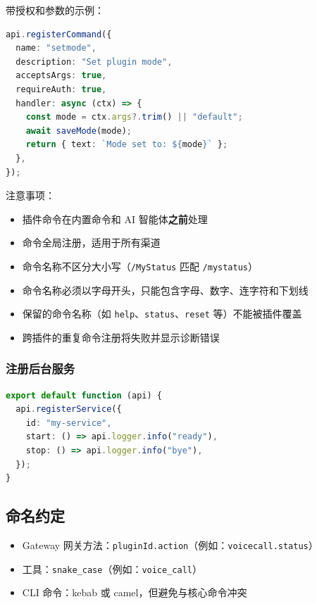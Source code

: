 带授权和参数的示例：

\begin{lstlisting}[language=typescript]
api.registerCommand({
  name: "setmode",
  description: "Set plugin mode",
  acceptsArgs: true,
  requireAuth: true,
  handler: async (ctx) => {
    const mode = ctx.args?.trim() || "default";
    await saveMode(mode);
    return { text: `Mode set to: ${mode}` };
  },
});
\end{lstlisting}


注意事项：

\begin{itemize}
  \item 插件命令在内置命令和 AI 智能体\textbf{之前}处理
  \item 命令全局注册，适用于所有渠道
  \item 命令名称不区分大小写（\texttt{/MyStatus} 匹配 \texttt{/mystatus}）
  \item 命令名称必须以字母开头，只能包含字母、数字、连字符和下划线
  \item 保留的命令名称（如 \texttt{help}、\texttt{status}、\texttt{reset} 等）不能被插件覆盖
  \item 跨插件的重复命令注册将失败并显示诊断错误
\end{itemize}


\subsubsection{注册后台服务}


\begin{lstlisting}[language=typescript]
export default function (api) {
  api.registerService({
    id: "my-service",
    start: () => api.logger.info("ready"),
    stop: () => api.logger.info("bye"),
  });
}
\end{lstlisting}


\subsection{命名约定}


\begin{itemize}
  \item Gateway 网关方法：\texttt{pluginId.action}（例如：\texttt{voicecall.status}）
  \item 工具：\texttt{snake\_case}（例如：\texttt{voice\_call}）
  \item CLI 命令：kebab 或 camel，但避免与核心命令冲突
\end{itemize}


